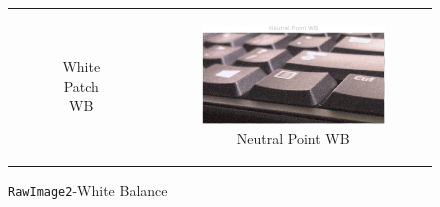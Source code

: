 \documentclass[11pt, a4]{article}
\begin{document}
\begin{enumerate}
\begin{enumerate}
\begin{figure}[h]
{\begin{tabular}{cc}
\begin{subfigure}[h]{0.45\linewidth}
							\caption{White Patch WB}
							\label{fig:RawImage2_WB_3}
						\end{subfigure} &
						\begin{subfigure}[h]{0.45\linewidth}
							\centering
							\includegraphics[width=\linewidth]{../output/RawImage2_WB_4.pdf}
							\caption{Neutral Point WB}
							\label{fig:RawImage2_WB_4}
						\end{subfigure}
					\end{tabular}
				}
				\caption{\texttt{RawImage2}-White Balance}
				\label{fig:RawImage2_WB}
			\end{figure}   
			

\end{enumerate}
\end{enumerate}
\end{document}
